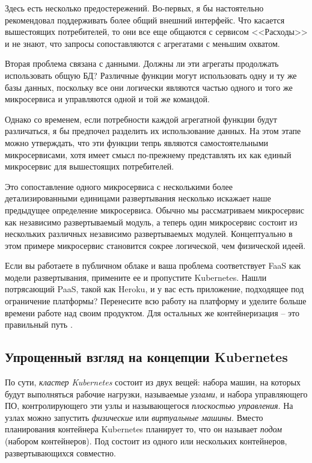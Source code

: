 \documentclass[%
	11pt,
	a4paper,
	utf8,
		]{article}
\begin{document}
Здесь есть несколько предостережений. Во-первых, я бы настоятельно рекомендовал поддерживать более общий внешний интерфейс. Что касается вышестоящих потребителей, то они все еще общаются с сервисом <<Расходы>> и не знают, что запросы сопоставляются с агрегатами с меньшим охватом.

Вторая проблема связана с данными. Должны ли эти агрегаты продолжать использовать общую БД? Различные функции могут использовать одну и ту же базы данных, поскольку все они логически являются частью одного и того же микросервиса и управляются одной и той же командой.

Однако со временем, если потребности каждой агрегатной функции будут различаться, я бы предпочел разделить их использование данных. На этом этапе можно утверждать, что эти функции тепрь являются самостоятельными микросервисами, хотя имеет смысл по-прежнему представлять их как единый микросервис для вышестоящих потребителей.

Это сопоставление одного микросервиса с несколькими более детализированными единицами развертывания несколько искажает наше предыдущее определение микросервиса. Обычно мы рассматриваем микросервис как независимо развертываемый модуль, а теперь один микросервис состоит из нескольких различных независимо развертываемых модулей. Концептуально в этом примере микросервис становится сокрее логической, чем физической идеей.

Если вы работаете в публичном облаке и ваша проблема соответствует FaaS как модели развертывания, примените ее и пропустите Kubernetes. Нашли потрясающий PaaS, такой как Heroku, и у вас есть приложение, подходящее под ограничение платформы? Перенесите всю работу на платформу и уделите больше времени работе над своим продуктом. Для остальных же контейнеризация -- это правильный путь \cite[]{microservices-2024}.

\subsection{Упрощенный взгляд на концепции Kubernetes}

По сути, \emph{кластер Kubernetes} состоит из двух вещей: набора машин, на которых будут выполняться рабочие нагрузки, называемые \emph{узлами}, и набора управляющего ПО, контролирующего эти узлы и называющегося \emph{плоскостью управления}. На узлах можно запустить \emph{физические} или \emph{виртуальные машины}. Вместо планирования контейнера Kubernetes планирует то, что он называет \emph{подом} (набором контейнеров). Под состоит из одного или нескольких контейнеров, развертывающихся совместно.
\end{document}

